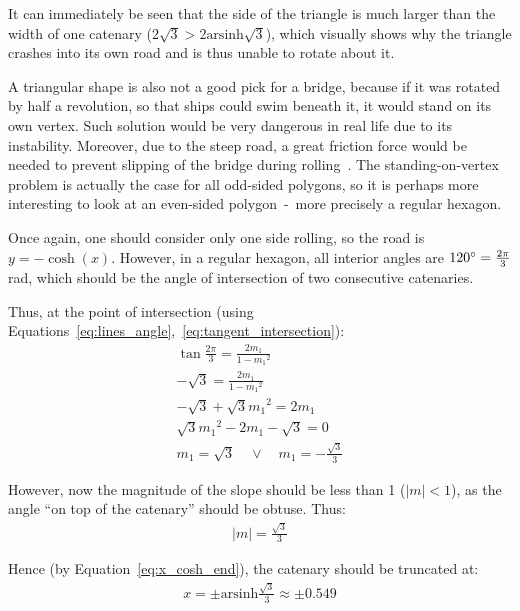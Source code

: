 \documentclass[12pt]{article}
\begin{document}
        It can immediately be seen that the side of the triangle is much larger than the width of one catenary ($2\sqrt{3} > 2\text{arsinh}\sqrt{3}$), which visually shows why the triangle crashes into its own road and is thus unable to rotate about it.

        A triangular shape is also not a good pick for a bridge, because if it was rotated by half a revolution, so that ships could swim beneath it, it would stand on its own vertex. Such solution would be very dangerous in real life due to its instability. Moreover, due to the steep road, a great friction force would be needed to prevent slipping of the bridge during rolling~\cite{bridge_wolfram}. The standing-on-vertex problem is actually the case for all odd-sided polygons, so it is perhaps more interesting to look at an even-sided polygon~-~more precisely a regular hexagon.

        Once again, one should consider only one side rolling, so the road is $y = -\cosh(x)$. However, in a regular hexagon, all interior angles are $120\degree = \frac{2\pi}{3}$ rad, which should be the angle of intersection of two consecutive catenaries. 
        
        Thus, at the point of intersection (using Equations~\ref{eq:lines_angle},~\ref{eq:tangent_intersection}):
        \begin{align}
            \tan \frac{2\pi}{3} = \frac{2m_1}{1 - {m_1}^2} \\
            - \sqrt{3} = \frac{2m_1}{1 - {m_1}^2} \\
            -\sqrt{3} + \sqrt{3}{m_1}^2 = 2m_1 \\
            \sqrt{3}{m_1}^2 - 2m_1 - \sqrt{3} = 0 \\
            m_1 = \sqrt{3} \quad \lor \quad m_1 = - \frac{\sqrt{3}}{3}
        \end{align}

        However, now the magnitude of the slope should be less than 1 ($|m|<1$), as the angle ``on top of the catenary'' should be obtuse. Thus:
        \begin{align}
            |m| = \frac{\sqrt{3}}{3} 
        \end{align}

        Hence (by Equation~\ref{eq:x_cosh_end}), the catenary should be truncated at:
        \begin{align}
            x = \pm \text{arsinh}\frac{\sqrt{3}}{3} \approx \pm 0.549
        \end{align}
\end{document}
